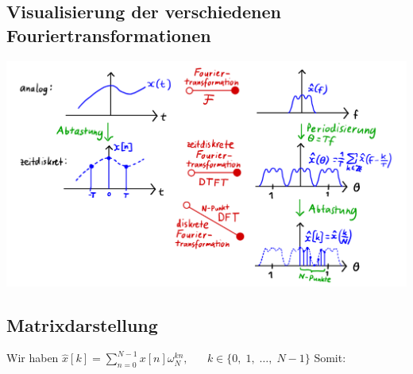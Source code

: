 \documentclass[11pt]{article}
\begin{document}
%

\subsection*{Visualisierung der verschiedenen Fouriertransformationen}
\vspace*{-0.5cm}
\begin{center}
    \includegraphics[width=0.8\linewidth]{docimgs/DFT_visuals.jpeg}
\end{center}

\vspace*{-0.5cm}
\subsection*{Matrixdarstellung}
\vspace*{-0.5cm}
Wir haben $\hat{x}[k] = \displaystyle\sum_{n=0}^{N-1} x[n]\omega_N^{kn}, \hspace{20pt} k \in \{ 0, \; 1, \; \dots, \; N-1 \}$ Somit:
\end{document}
